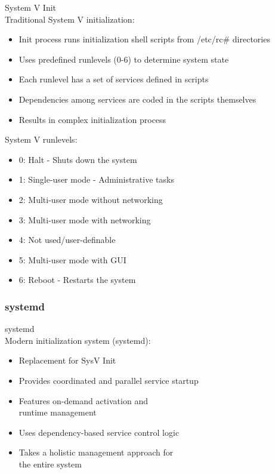\begin{concept}{System V Init}\\
    Traditional System V initialization:
    \begin{itemize}
        \item Init process runs initialization shell scripts from /etc/rc\# directories
        \item Uses predefined runlevels (0-6) to determine system state
        \item Each runlevel has a set of services defined in scripts
        \item Dependencies among services are coded in the scripts themselves
        \item Results in complex initialization process
    \end{itemize}
    \vspace{2mm}
    System V runlevels:
    \begin{itemize}
        \item 0: Halt - Shuts down the system
        \item 1: Single-user mode - Administrative tasks
        \item 2: Multi-user mode without networking
        \item 3: Multi-user mode with networking
        \item 4: Not used/user-definable
        \item 5: Multi-user mode with GUI
        \item 6: Reboot - Restarts the system
    \end{itemize}
\end{concept}

\subsubsection{systemd}


\begin{definition}{systemd}\\
    Modern initialization system (systemd):
    \begin{itemize}
        \item Replacement for SysV Init
        \item Provides coordinated and parallel service startup
        \item Features on-demand activation and \\ runtime management
        \item Uses dependency-based service control logic
        \item Takes a holistic management approach for \\ the entire system
    \end{itemize}
\end{definition}

